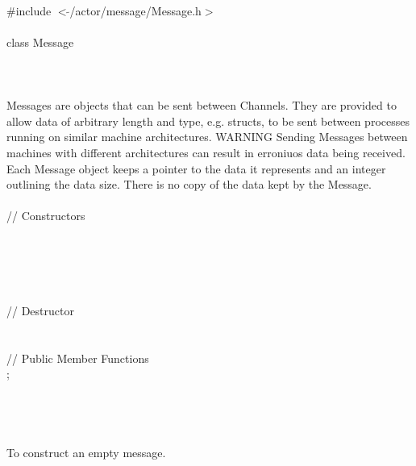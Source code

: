 
   \\
\indent \#include $<\tilde{ }$/actor/message/Message.h$>$  \\

  \\
\indent class Message \\

 \\
 \\

  \\
\indent Messages are objects that can be sent between Channels. They
are provided to allow data of arbitrary length and type, e.g. structs,
to be sent between processes running on similar machine
architectures. WARNING Sending Messages between machines with different
architectures can result in erroniuos data being received. Each
Message object keeps a pointer to the data it represents and an integer
outlining the data size. There is no copy of the data kept by the
Message. \\


  \\
\indent // Constructors  \\
  \\
\\
\\
 \\ \\
\indent // Destructor \\
\\  \\
\indent // Public Member Functions  \\
; \\  
\\
 \\

  \\
  \\
To construct an empty message. \\

